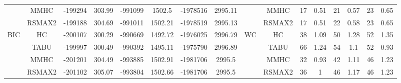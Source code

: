 \begin{table}[h]
{\begin{tabular}{cc||cc|cc|cc||cc|cc|cc|cc}
& MMHC &	-199294 & 	303.99 & 	-991099 & 	1502.5 & 	-1978516 & 	2995.11 & 	& MMHC &	17 & 	0.51 & 	21 & 	0.57 & 	23 & 	0.65\tabularnewline													
& RSMAX2 &	-199188 & 	304.69 & 	-991011 & 	1502.21 & 	-1978519 & 	2995.13 & 	& RSMAX2 &	17 & 	0.51 & 	22 & 	0.58 & 	23 & 	0.65\tabularnewline													
\hline																										
\multirow{4}{*}{BIC} & HC &	-200107 & 	300.29 & 	-990669 & 	1492.72 & 	-1976025 & 	2996.79 & 	\multirow{4}{*}{WC} & HC &	38 & 	1.09 & 	50 & 	1.28 & 	52 & 	1.35\tabularnewline													
& TABU &	-199997 & 	300.49 & 	-990392 & 	1495.11 & 	-1975790 & 	2996.89 & 	& TABU &	66 & 	1.24 & 	54 & 	1.1 & 	52 & 	0.93\tabularnewline													
& MMHC &	-201201 & 	304.49 & 	-993885 & 	1502.91 & 	-1981706 & 	2995.5 & 	& MMHC &	32 & 	0.93 & 	42 & 	1.11 & 	46 & 	1.23\tabularnewline													
& RSMAX2 &	-201102 & 	305.07 & 	-993804 & 	1502.66 & 	-1981706 & 	2995.5 & 	& RSMAX2 &	36 & 	1 & 	46 & 	1.17 & 	46 & 	1.23\tabularnewline													
\hline																										
\end{tabular}																										
}																										
\end{table}																										


